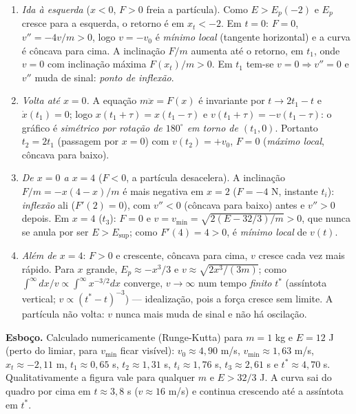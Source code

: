 \documentclass{article}%
\begin{document}
\begin{enumerate}
\item \textit{Ida à esquerda} ($x<0$, $F>0$ freia a partícula). Como $E>E_p(-2)$ e $E_p$ cresce para a esquerda, o retorno é em $x_t<-2$. Em $t=0$: $F=0$, $v''=-4v/m>0$, logo $v=-v_0$ é \emph{mínimo local} (tangente horizontal) e a curva é côncava para cima. A inclinação $F/m$ aumenta até o retorno, em $t_1$, onde $v=0$ com inclinação máxima $F(x_t)/m>0$. Em $t_1$ tem-se $v=0\Rightarrow v''=0$ e $v''$ muda de sinal: \emph{ponto de inflexão}.
\item \textit{Volta até $x=0$.} A equação $m\ddot x=F(x)$ é invariante por $t\to 2t_1-t$ e $\dot x(t_1)=0$; logo $x(t_1+\tau)=x(t_1-\tau)$ e $v(t_1+\tau)=-v(t_1-\tau)$: o gráfico é \emph{simétrico por rotação de $180^\circ$ em torno de $(t_1,0)$}. Portanto $t_2=2t_1$ (passagem por $x=0$) com $v(t_2)=+v_0$, $F=0$ (\emph{máximo local}, côncava para baixo).
\item \textit{De $x=0$ a $x=4$} ($F<0$, a partícula desacelera). A inclinação $F/m=-x(4-x)/m$ é mais negativa em $x=2$ ($F=-4$ N, instante $t_i$): \emph{inflexão} ali ($F'(2)=0$), com $v''<0$ (côncava para baixo) antes e $v''>0$ depois. Em $x=4$ ($t_3$): $F=0$ e $v=v_{\min}=\sqrt{2(E-32/3)/m}>0$, que nunca se anula por ser $E>E_{\sup}$; como $F'(4)=4>0$, é \emph{mínimo local} de $v(t)$.
\item \textit{Além de $x=4$}: $F>0$ e crescente, côncava para cima, $v$ cresce cada vez mais rápido. Para $x$ grande, $E_p\approx-x^3/3$ e $v\approx\sqrt{2x^3/(3m)}$; como $\int^\infty dx/v\propto\int^\infty x^{-3/2}dx$ converge, $v\to\infty$ num tempo \emph{finito} $t^*$ (assíntota vertical; $v\propto(t^*-t)^{-3}$) --- idealização, pois a força cresce sem limite. A partícula não volta: $v$ nunca mais muda de sinal e não há oscilação.
\end{enumerate}

\textbf{Esboço.} Calculado numericamente (Runge-Kutta) para $m=1$ kg e $E=12$ J (perto do limiar, para $v_{\min}$ ficar visível): $v_0\approx4{,}90$ m/s, $v_{\min}\approx1{,}63$ m/s, $x_t\approx-2{,}11$ m, $t_1\approx0{,}65$ s, $t_2\approx1{,}31$ s, $t_i\approx1{,}76$ s, $t_3\approx2{,}61$ s e $t^*\approx4{,}70$ s. Qualitativamente a figura vale para qualquer $m$ e $E>32/3$ J. A curva sai do quadro por cima em $t\approx3{,}8$ s ($v\approx16$ m/s) e continua crescendo até a assíntota em $t^*$.
\end{document}
